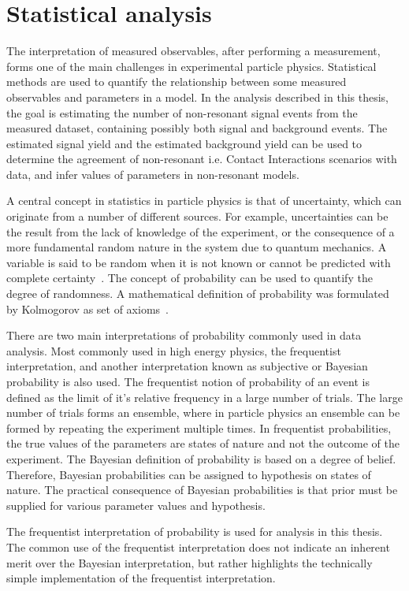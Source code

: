\chapter{Statistical analysis}\label{chap:stats}

The interpretation of measured observables, after performing a measurement, forms one of the main challenges in experimental particle physics. Statistical methods are used to quantify the relationship between some measured observables and parameters in a model. In the analysis described in this thesis, the goal is estimating the number of non-resonant signal events from the measured dataset, containing possibly both signal and background events. The estimated signal yield and the estimated background yield can be used to determine the agreement of non-resonant i.e. Contact Interactions scenarios with data, and infer values of parameters in non-resonant models. 

A central concept in statistics in particle physics is that of uncertainty, which can originate from a number of different sources. For example, uncertainties can be the result from the lack of knowledge of the experiment, or the consequence of a more fundamental random nature in the system due to quantum mechanics. A variable is said to be random when it is not known or cannot be predicted with complete certainty~\cite{Cowan1998}. The concept of probability can be used to quantify the degree of randomness. A mathematical definition of probability was formulated by Kolmogorov as set of axioms~\cite{Kol33}. 

There are two main interpretations of probability commonly used in data analysis. Most commonly used in high energy physics, the frequentist interpretation, and another interpretation known as subjective or Bayesian probability is also used. The frequentist notion of probability of an event is defined as the limit of it's relative frequency in a large number of trials. The large number of trials forms an ensemble, where in particle physics an ensemble can be formed by repeating the experiment multiple times. In frequentist probabilities, the true values of the parameters are states of nature and not the outcome of the experiment. The Bayesian definition of probability is based on a degree of belief. Therefore, Bayesian probabilities can be assigned to hypothesis on states of nature. The practical consequence of Bayesian probabilities is that prior must be supplied for various parameter values and hypothesis. 

The frequentist interpretation of probability is used for analysis in this thesis. The common use of the frequentist interpretation does not indicate an inherent merit over the Bayesian interpretation, but rather highlights the technically simple implementation of the frequentist interpretation. 

